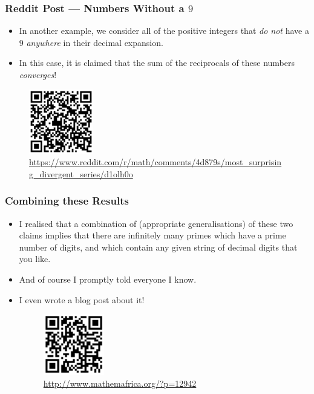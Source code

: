 \documentclass{beamer}
\begin{document}
\begin{frame}
    \frametitle{Reddit Post — Numbers Without a $9$}

    \begin{itemize}
        \item In another example, we consider all of the positive integers that \emph{do not} have a $9$ \emph{anywhere} in their decimal expansion. \pause
        \item In this case, it is claimed that the sum of the reciprocals of these numbers \emph{converges}!
    \end{itemize} 

    \begin{figure}
        \centering
        \includegraphics[width=0.25\textwidth]{reddit_kempner.png}
        \caption{\url{https://www.reddit.com/r/math/comments/4d879s/most_surprising_divergent_series/d1olh0o}}
    \end{figure}

\end{frame}

\begin{frame}
    \frametitle{Combining these Results}

    \begin{itemize}
        \item I realised that a combination of (appropriate generalisations) of these two claims implies that there are infinitely many primes which have a prime number of digits, and which contain any given string of decimal digits that you like. \pause
        \item And of course I promptly told everyone I know. \pause
        \item I even wrote a blog post about it!
        \begin{figure}
            \centering
            \includegraphics[width=0.25\textwidth]{mathemafrica_link.png}
            \caption{\url{http://www.mathemafrica.org/?p=12942}}
        \end{figure}
    \end{itemize}
    
\end{frame}
\end{document}
